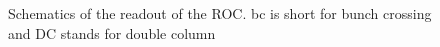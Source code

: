 \documentclass[british,11pt,a4paper]{memoir}
\begin{document}
\begin{figure}[ht]
	\centering
	\hfill
	\caption{Schematics of the readout of the \ac{ROC}. bc is short for bunch crossing and DC stands for double column}
	\label{pro}
\end{figure}\no
\end{document}
